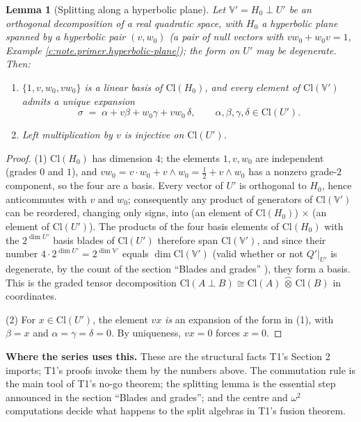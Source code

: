 \documentclass[11pt]{article}
\newtheorem{lemma}[theorem]{Lemma}
\theoremstyle{definition}
\theoremstyle{plain}
\providecommand{\Cl}{}\renewcommand{\Cl}{\mathrm{Cl}}
\begin{document}
\begin{lemma}[Splitting along a hyperbolic plane]\label{c:primer.splitting-along-hyperbolic-plane}
Let $\mathbb{V}' = H_0 \perp U'$ be an orthogonal decomposition of a real quadratic space, with $H_0$ a hyperbolic plane spanned by a hyperbolic pair $(v, w_0)$ (a pair of null vectors with $v w_0 + w_0 v = 1$, Example \ref{c:note.primer.hyperbolic-plane}); the form on $U'$ may be degenerate. Then:
\begin{enumerate}
\item $\{1, v, w_0, v w_0\}$ is a linear basis of $\Cl(H_0)$, and every element of $\Cl(\mathbb{V}')$ admits a \emph{unique} expansion
\[
\sigma \;=\; \alpha + v\beta + w_0\gamma + v w_0\,\delta, \qquad \alpha, \beta, \gamma, \delta \in \Cl(U').
\]
\item Left multiplication by $v$ is injective on $\Cl(U')$.
\end{enumerate}
\end{lemma}
\begin{proof}
(1) $\Cl(H_0)$ has dimension $4$; the elements $1, v, w_0$ are independent (grades $0$ and $1$), and $v w_0 = v \cdot w_0 + v \wedge w_0 = \tfrac12 + v \wedge w_0$ has a nonzero grade-$2$ component, so the four are a basis. Every vector of $U'$ is orthogonal to $H_0$, hence anticommutes with $v$ and $w_0$; consequently any product of generators of $\Cl(\mathbb{V}')$ can be reordered, changing only signs, into (an element of $\Cl(H_0)$)$\,\times\,$(an element of $\Cl(U')$). The products of the four basis elements of $\Cl(H_0)$ with the $2^{\dim U'}$ basis blades of $\Cl(U')$ therefore span $\Cl(\mathbb{V}')$, and since their number $4 \cdot 2^{\dim U'} = 2^{\dim \mathbb{V}'}$ equals $\dim \Cl(\mathbb{V}')$ (valid whether or not $Q'|_{U'}$ is degenerate, by the count of the section ``Blades and grades'' \cite{Chevalley1997}), they form a basis. This is the graded tensor decomposition $\Cl(A \perp B) \cong \Cl(A)\,\hat{\otimes}\,\Cl(B)$ \cite{Lam2005} in coordinates.

(2) For $x \in \Cl(U')$, the element $vx$ \emph{is} an expansion of the form in (1), with $\beta = x$ and $\alpha = \gamma = \delta = 0$. By uniqueness, $vx = 0$ forces $x = 0$.

\end{proof}

\label{c:note.primer.setting-toolkit-classical-lemmas-series-imports-2}
\textbf{Where the series uses this.} These are the structural facts T1's Section 2 imports; T1's proofs invoke them by the numbers above. The commutation rule is the main tool of T1's no-go theorem; the splitting lemma is the essential step announced in the section ``Blades and grades''; and the centre and $\omega^2$ computations decide what happens to the split algebras in T1's fusion theorem.
\end{document}
